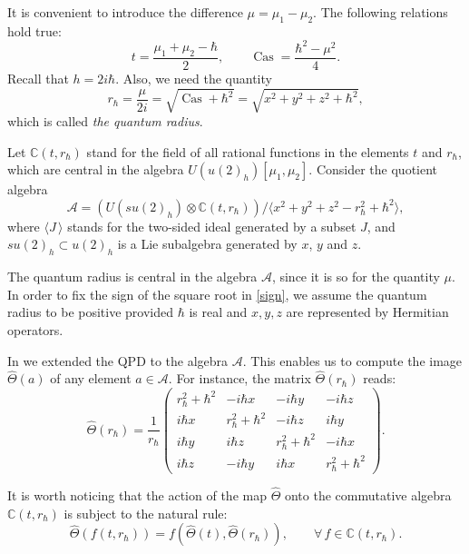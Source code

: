 \documentclass[10pt,a4paper]{amsart}
\newcommand{\ot}{\otimes}
\newcommand{\C}{\mathbb{C}}
\renewcommand{\AA}{\mathcal{A}}
\DeclareMathOperator{\Cas}{Cas}
\newcommand{\hh}{\hbar}
\newcommand{\hatt}{\widehat{\Theta}}
\newcommand{\rh}{r_{\hbar}}
\numberwithin{equation}{section}
\begin{document}
It is convenient to introduce the difference $\mu=\mu_1-\mu_2$.
The following relations hold true:
\begin{equation}
t=\frac{\mu_1+\mu_2-\hh}{2},\qquad {{\Cas}}=\frac{\hh^2-\mu^2}{4}.
\label{cas}
\end{equation}
Recall that $h=2i\hh$. Also, we need the quantity
\begin{equation}
\rh=\frac{\mu}{2i}=\sqrt{\Cas+\hh^2}  = \sqrt{x^2+y^2+z^2+\hh^2},
\label{sign}
\end{equation}
which is called {\em the quantum radius}.

Let $\C(t,\rh) $ stand for the field of all rational functions in the elements $t$ and $\rh$, which are central in the algebra
$U(u(2)_h)[\mu_1,\mu_2]$. Consider the quotient algebra
\begin{equation}
\AA=\left(U(su(2)_h)\ot \C(t,\rh)\right)/\langle x^2+y^2+z^2-\rh^2+\hh^2 \rangle,
\label{quot}
\end{equation}
where $\langle J \,\rangle$ stands for the two-sided ideal generated by a subset $J$, and $su(2)_h\subset u(2)_h$ is a Lie
subalgebra generated by $x$, $y$ and $z$.

The quantum radius is central in the  algebra $\AA$, since it is so for the quantity $\mu$.
In order to fix the sign of the square root in \eqref{sign}, we assume  the quantum
radius to be positive provided $\hh$ is real and $x,y,z$ are  represented by Hermitian operators.

In \cite{GS2} we extended the QPD to the algebra $\AA$. This enables us to compute the image $\hatt(a)$
of any element  $a\in \AA$. For instance, the matrix $\hatt(\rh)$ reads:
\begin{equation} {\hatt}(\rh)=
\frac{1}{\rh}\left(\!\!
\begin{array}{cccc}
	\rh^2+\hh^2 &   \displaystyle -i\hh x\,& \displaystyle -i\hh y &\displaystyle -i\hh z\\
	\displaystyle  i\hh x&\rh^2+\hh^2&\displaystyle -i\hh z &\displaystyle i\hh y \\
	\displaystyle i\hh y &\displaystyle i\hh z & \rh^2+\hh^2 &\displaystyle -i\hh x\\
	\displaystyle i\hh z &\displaystyle -i\hh y & \displaystyle i\hh x& \rh^2+\hh^2
\end{array}
\!\!\right).
\label{mat1}
\end{equation}

It is worth noticing that  the action of the map $\hatt$ onto the commutative algebra $\C(t,\rh)$ is subject to the natural rule:
\[
\hatt(f(t,\rh))=f(\hatt(t), \hatt(\rh)),\qquad \forall\, f\in \C(t,\rh).
\]
\end{document}
